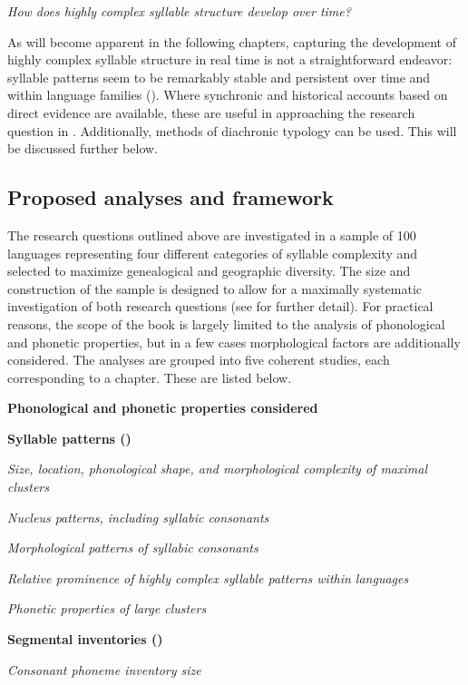\ea\label{ex:1.24}
   \textit{How does highly complex syllable structure develop over time?}
\z

  As will become apparent in the following chapters, capturing the development of highly complex syllable structure in real time is not a straightforward endeavor: syllable patterns seem to be remarkably stable and persistent over time and within language families (\citealt{NapoleãodeSouza2017}). Where synchronic and historical accounts based on direct evidence are available, these are useful in approaching the research question in . Additionally, methods of diachronic typology can be used. This will be discussed further below.

\subsection{Proposed analyses and framework}\label{sec:1.4.2}

  The research questions outlined above are investigated in a sample of 100 languages representing four different categories of syllable complexity and selected to maximize genealogical and geographic diversity. The size and construction of the sample is designed to allow for a maximally systematic investigation of both research questions (see  for further detail). For practical reasons, the scope of the book is largely limited to the analysis of phonological and phonetic properties, but in a few cases morphological factors are additionally considered. The analyses are grouped into five coherent studies, each corresponding to a chapter. These are listed below.

\ea\label{ex:1.25}
  \textbf{Phonological and phonetic properties considered}

\textbf{Syllable patterns ()}

\textit{Size, location, phonological shape, and morphological complexity of maximal clusters}

\textit{Nucleus patterns, including syllabic consonants}

\textit{Morphological patterns of syllabic consonants}

\textit{Relative prominence of highly complex syllable patterns within languages}

\textit{Phonetic properties of large clusters}

\textbf{Segmental inventories ()}

\textit{Consonant phoneme inventory size}

